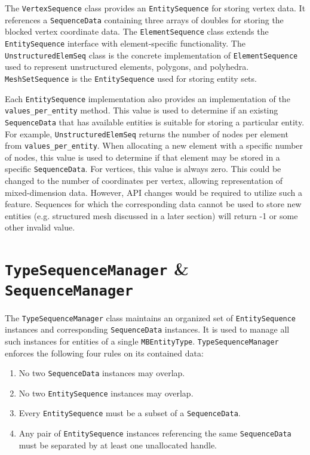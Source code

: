 \documentclass{report}
\begin{document}
The \texttt{VertexSequence} class provides an \texttt{EntitySequence} for storing vertex data.  It references a \texttt{SequenceData} containing three arrays of doubles for storing the blocked vertex coordinate data.  The \texttt{ElementSequence} class extends the \texttt{EntitySequence} interface with element-specific functionality.  The \texttt{UnstructuredElemSeq} class is the concrete implementation of \texttt{ElementSequence} used to represent unstructured elements, polygons, and polyhedra.  \texttt{MeshSetSequence} is the \texttt{EntitySequence} used for storing entity sets.

Each \texttt{EntitySequence} implementation also provides an implementation of the \texttt{values\_per\_entity} method.  This value is used to determine if an existing \texttt{SequenceData} that has available entities is suitable for storing a particular entity.  For example, \texttt{UnstructuredElemSeq} returns the number of nodes per element from \texttt{values\_per\_entity}.  When allocating a new element with a specific number of nodes, this value is used to determine if that element may be stored in a specific \texttt{SequenceData}.  For vertices, this value is always zero.  This could be changed to the number of coordinates per vertex, allowing representation of mixed-dimension data. However, API changes would be required to utilize such a feature.  Sequences for which the corresponding data cannot be used to store new entities (e.g. structured mesh discussed in a later section) will return -1 or some other invalid value.


\section{\texttt{TypeSequenceManager} \& \texttt{SequenceManager}}

The \texttt{TypeSequenceManager} class maintains an organized set of \texttt{EntitySequence} instances and corresponding \texttt{SequenceData} instances. It is used to manage all such instances for entities of a single \texttt{MBEntityType}.  \texttt{TypeSequenceManager} enforces the following four rules on its contained data:
\begin{enumerate}
\item No two \texttt{SequenceData} instances may overlap.
\item No two \texttt{EntitySequence} instances may overlap.
\item Every \texttt{EntitySequence} must be a subset of a \texttt{SequenceData}.
\item Any pair of \texttt{EntitySequence} instances referencing the same \texttt{SequenceData} must be separated by at least one unallocated handle.
\end{enumerate}
\end{document}
